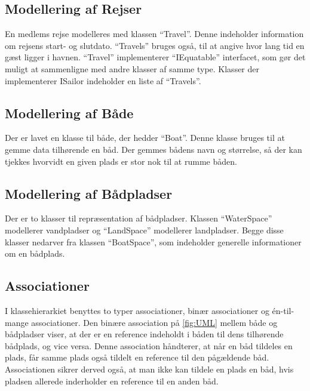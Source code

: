 \subsection{Modellering af Rejser}
\label{sub:rejser}

En medlems rejse modelleres med klassen \enquote{Travel}. Denne indeholder information om rejsens start- og slutdato. \enquote{Travels} bruges også, til at angive hvor lang tid en gæst ligger i havnen. \enquote{Travel} implementerer \enquote{IEquatable} interfacet, som gør det muligt at sammenligne med andre klasser af samme type. Klasser der implementerer ISailor indeholder en liste af \enquote{Travels}.
 
\subsection{Modellering af Både}
\label{sub:bade}

Der er lavet en klasse til både, der hedder \enquote{Boat}. Denne klasse bruges til at gemme data tilhørende en båd. Der gemmes bådens navn og størrelse, så der kan tjekkes hvorvidt en given plads er stor nok til at rumme båden.

\subsection{Modellering af Bådpladser}
\label{sub:pladser}

Der er to klasser til repræsentation af bådpladser. Klassen \enquote{WaterSpace} modellerer vandpladser og \enquote{LandSpace} modellerer landpladser. Begge disse klasser nedarver fra klassen \enquote{BoatSpace}, som indeholder generelle informationer om en bådplads. 

\subsection{Associationer}
\label{sub:associationer}

I klassehierarkiet benyttes to typer associationer, binær associationer og én-til-mange associationer. Den binære association på \cref{fig:UML} mellem både og bådpladser viser, at der er en reference indeholdt i båden til dens tilhørende bådplads, og vice versa. Denne association håndterer, at når en båd tildeles en plads, får samme plads også tildelt en reference til den pågældende båd. Associationen sikrer derved også, at man ikke kan tildele en plads en båd, hvis pladsen allerede inderholder en reference til en anden båd. 

